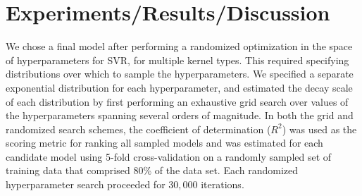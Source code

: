 \documentclass[12]{article}
\begin{document}
\section*{Experiments/Results/Discussion}

\noindent We chose a final model after performing a randomized optimization in the space of hyperparameters for SVR, for multiple kernel types. This required specifying distributions over which to sample the hyperparameters. We specified a separate exponential distribution for each hyperparameter, and estimated the decay scale of each distribution by first performing an exhaustive grid search over values of the hyperparameters spanning several orders of magnitude. In both the grid and randomized search schemes, the coefficient of determination ($R^2$) was used as the scoring metric for ranking all sampled models and was estimated for each candidate model using 5-fold cross-validation on a randomly sampled set of training data that comprised 80\% of the data set. Each randomized hyperparameter search proceeded for $30,000$ iterations.\\ 
\end{document}
